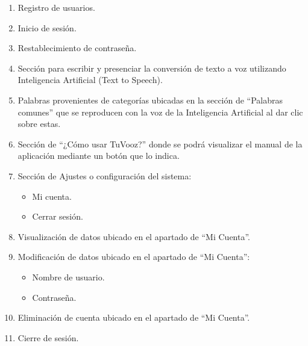 \documentclass[12pt, a4paper, twocolumn]{article}
\begin{document}
\begin{enumerate}
    \item Registro de usuarios.
    \item Inicio de sesión.
    \item Restablecimiento de contraseña.
    \item Sección para escribir y presenciar la conversión de texto a voz utilizando Inteligencia Artificial (Text to Speech).
    \item Palabras provenientes de categorías ubicadas en la sección de “Palabras comunes” que se reproducen con la voz de la Inteligencia Artificial al dar clic sobre estas.
    \item Sección de “¿Cómo usar TuVooz?” donde se podrá visualizar el manual de la aplicación mediante un botón que lo indica.
    \item Sección de Ajustes o configuración del sistema:
    \begin{itemize}
        \item Mi cuenta.
        \item Cerrar sesión.
    \end{itemize}
    \item Visualización de datos ubicado en el apartado de “Mi Cuenta”.
    \item Modificación de datos ubicado en el apartado de “Mi Cuenta”:
    \begin{itemize}
        \item Nombre de usuario.
        \item Contraseña.
    \end{itemize}
    \item Eliminación de cuenta ubicado en el apartado de “Mi Cuenta”.
    \item Cierre de sesión.
\end{enumerate}
\end{document}
